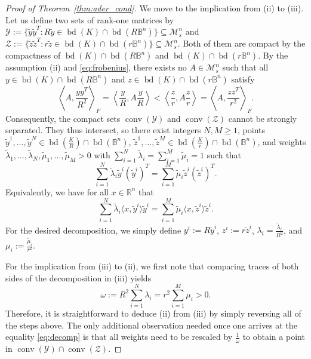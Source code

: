 \documentclass[12pt,a4paper]{article}
\theoremstyle{definition}
\DeclareMathOperator{\conv}{conv}
\DeclareMathOperator{\bd}{bd}
\newcommand\R{\mathbb{R}}
\newcommand\B{\mathbb{B}}
\newcommand\CY{\mathcal{Y}}
\newcommand\CZ{\mathcal{Z}}
\newcommand\ms[1]{\mathcal{M}_s^{#1}}
\begin{document}
\begin{proof}[Proof of Theorem~\ref{thm:ader_cond}]
We move to the implication from (ii) to (iii). Let us define two sets of rank-one matrices by $\CY := \{ \tilde{y} \tilde{y}^T : R \tilde{y} \in \bd(K) \cap \bd(R\B^n) \} \subseteq \ms{n}$ and $\CZ := \{ \tilde{z} \tilde{z}^T : r \tilde{z} \in \bd(K) \cap \bd(r\B^n) \} \subseteq \ms{n}$. Both of them are compact by the compactness of $\bd(K) \cap \bd(R\B^n)$ and $\bd(K) \cap \bd(r\B^n)$. By the assumption (ii) and \eqref{eq:frobenius}, there exists no $A \in \ms{n}$ such that all $y \in \bd(K) \cap \bd(R\B^n)$ and $z \in \bd(K) \cap \bd(r\B^n)$ satisfy
$$ \left\langle A, \frac{y y^T}{R^2} \right\rangle_F = \left\langle \frac{y}{R}, A \frac{y}{R} \right\rangle < \left\langle \frac{z}{r}, A \frac{z}{r} \right\rangle = \left\langle A, \frac{z z^T}{r^2} \right\rangle_F. $$
Consequently, the compact sets $\conv(\CY)$ and $\conv(\CZ)$ cannot be strongly separated. They thus intersect, so there exist integers $N,M \geq 1$, points $\tilde{y}^1, \ldots, \tilde{y}^N \in \bd(\frac{K}{R}) \cap \bd(\B^n)$, $\tilde{z}^1, \ldots, \tilde{z}^M \in \bd(\frac{K}{r}) \cap \bd(\B^n)$, and weights $\tilde{\lambda}_1, \ldots, \tilde{\lambda}_N, \tilde{\mu}_1, \ldots, \tilde{\mu}_M > 0$ with $\sum_{i=1}^N \tilde{\lambda}_i = \sum_{i=1}^M \tilde{\mu}_i = 1$ such that
\begin{equation}
\label{eq:decomp}
\sum_{i=1}^N \tilde{\lambda}_i \tilde{y}^i (\tilde{y}^i)^T = \sum_{i=1}^M \tilde{\mu}_i \tilde{z}^i (\tilde{z}^i)^T.
\end{equation}
Equivalently, we have for all $x \in \R^n$ that
$$ \sum_{i=1}^N \tilde{\lambda}_i \langle x, \tilde{y}^i \rangle \tilde{y}^i = \sum_{i=1}^M \tilde{\mu}_i \langle x, \tilde{z}^i \rangle \tilde{z}^i. $$
For the desired decomposition, we simply define $y^i := R \tilde{y}^i$, $z^i := r \tilde{z}^i$, $\lambda_i = \frac{\tilde{\lambda}_i}{R^2}$, and $\mu_i := \frac{\tilde{\mu}_i}{r^2}$.
\newpage

For the implication from (iii) to (ii), we first note that comparing traces of both sides of the decomposition in (iii) yields
$$ \omega := R^2 \sum_{i=1}^N \lambda_i = r^2 \sum_{i=1}^M \mu_i > 0. $$
Therefore, it is straightforward to deduce (ii) from (iii) by simply reversing all of the steps above. The only additional observation needed once one arrives at the equality \eqref{eq:decomp} is that all weights need to be rescaled by $\frac{1}{\omega}$ to obtain a point in $\conv(\CY) \cap \conv(\CZ)$.


\end{proof}
\end{document}

